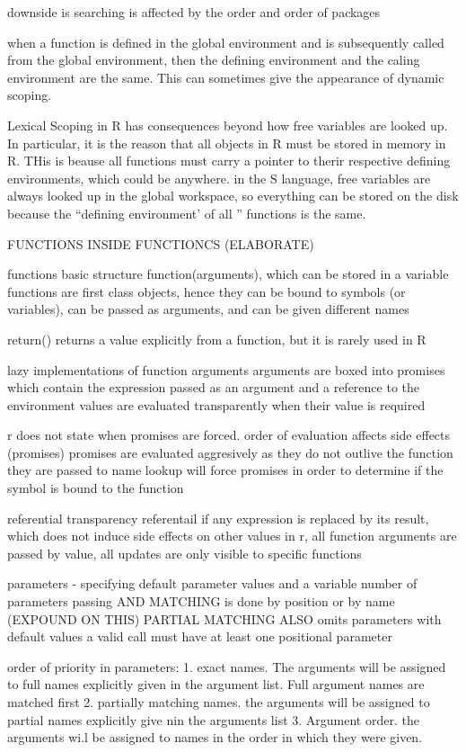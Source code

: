 \documentclass[12pt]{article}
\begin{document}
 downside is searching is affected by the order and order of packages

 when a function is defined in the global environment and is subsequently called from the global environment, then the defining environment and the caling environment are the same. This can sometimes give the appearance of dynamic scoping.

 Lexical Scoping in R has consequences beyond how free variables are looked up. In particular, it is the reason that all objects in R must be stored in memory in R. THis is beause all functions must carry a pointer to therir respective defining environments, which could be anywhere. in the S language, free variables are always looked up in the global workspace, so everything can be stored on the disk because the ``defining environment' of all '' functions is the same.

 FUNCTIONS INSIDE FUNCTIONCS (ELABORATE)

functions
basic structure
function(arguments), which can be stored in a variable
functions are first class objects, hence they can be bound to symbols (or variables), can be passed as arguments, and can be given different names

return() returns a value explicitly from a function, but it is rarely used in R

lazy implementations of function arguments
arguments are boxed into promises which contain the expression passed as an argument and a reference to the environment
values are evaluated transparently when their value is required

r does not state when promises are forced.
order of evaluation affects side effects (promises)
promises are evaluated aggresively as they do not outlive the function they are passed to
name lookup will force promises in order to determine if the symbol is bound to the function

referential transparency
referentail if any expression is replaced by its result, which does not induce side effects on other values
in r, all function arguments are passed by value, all updates are only visible to specific functions

parameters - specifying default parameter values and a variable number of parameters
passing AND MATCHING is done by position or by name (EXPOUND ON THIS)
PARTIAL MATCHING ALSO
omits parameters with default values
a valid call must have at least one positional parameter

order of priority in parameters:
1. exact names. The arguments will be assigned to full names explicitly given in the argument list. Full argument names are matched first
2. partially matching names. the arguments will be assigned to partial names explicitly give nin the arguments list
3. Argument order. the arguments wi.l be assigned to names in the order in which they were given.
\end{document}
